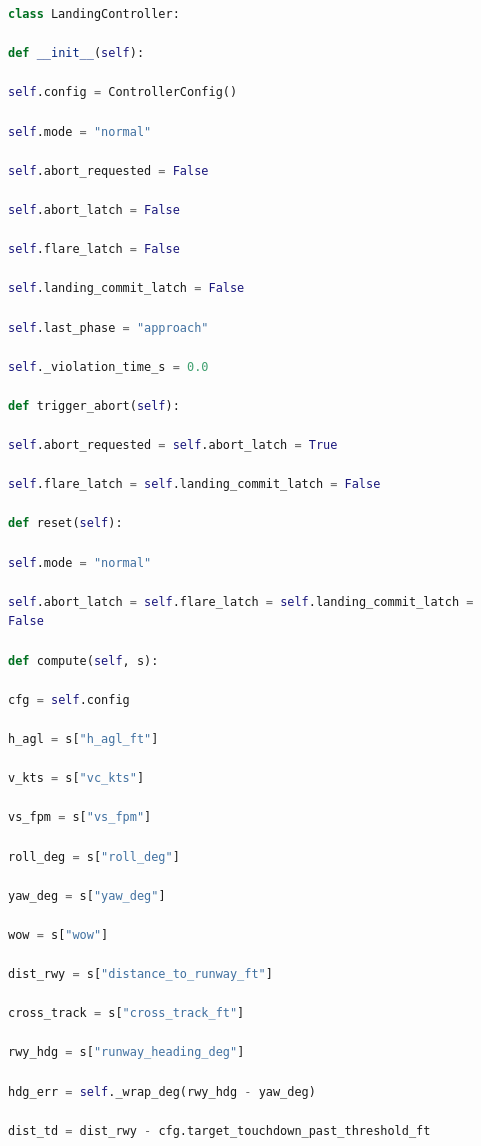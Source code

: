 \begin{lstlisting}[style=hutbcode,language=Python,caption={着陆控制器核心代码节选},label={lst:landing-controller}]
class LandingController:

def __init__(self):

self.config = ControllerConfig()

self.mode = "normal"

self.abort_requested = False

self.abort_latch = False

self.flare_latch = False

self.landing_commit_latch = False

self.last_phase = "approach"

self._violation_time_s = 0.0

def trigger_abort(self):

self.abort_requested = self.abort_latch = True

self.flare_latch = self.landing_commit_latch = False

def reset(self):

self.mode = "normal"

self.abort_latch = self.flare_latch = self.landing_commit_latch =
False

def compute(self, s):

cfg = self.config

h_agl = s["h_agl_ft"]

v_kts = s["vc_kts"]

vs_fpm = s["vs_fpm"]

roll_deg = s["roll_deg"]

yaw_deg = s["yaw_deg"]

wow = s["wow"]

dist_rwy = s["distance_to_runway_ft"]

cross_track = s["cross_track_ft"]

rwy_hdg = s["runway_heading_deg"]

hdg_err = self._wrap_deg(rwy_hdg - yaw_deg)

dist_td = dist_rwy - cfg.target_touchdown_past_threshold_ft
\end{lstlisting}
